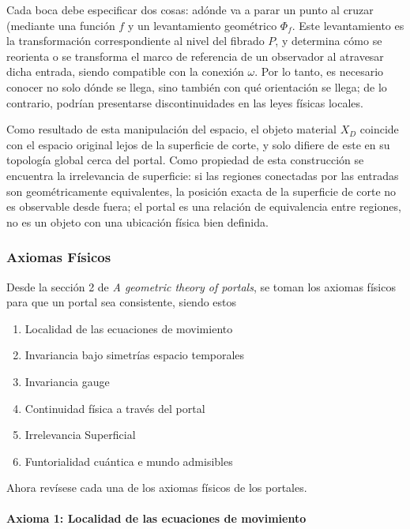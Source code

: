 \documentclass[12pt, twocolumn]{article}
\begin{document}
Cada boca debe especificar dos cosas: adónde va a parar un punto al cruzar (mediante una función $f$ y un levantamiento geométrico $\Phi_f$. Este levantamiento es la transformación correspondiente al nivel del fibrado $P$, y determina cómo se reorienta o se transforma el marco de referencia de un observador al atravesar dicha entrada, siendo compatible con la conexión $\omega$. Por lo tanto, es necesario conocer no solo dónde se llega, sino también con qué orientación se llega; de lo contrario, podrían presentarse discontinuidades en las leyes físicas locales.

Como resultado de esta manipulación del espacio, el objeto material $X_D$ coincide con el espacio original lejos de la superficie de corte, y solo difiere de este en su topología global cerca del portal. Como propiedad de esta construcción se encuentra la irrelevancia de superficie: si las regiones conectadas por las entradas son geométricamente equivalentes, la posición exacta de la superficie de corte no es observable desde fuera; el portal es una relación de equivalencia entre regiones, no es un objeto con una ubicación física bien definida.

\subsubsection{Axiomas Físicos}\label{sec:axiomas}

Desde la sección 2 de \textit{A geometric theory of portals}, se toman los axiomas físicos para que un portal sea consistente, siendo estos
 \begin{enumerate}
     \item Localidad de las ecuaciones de movimiento
     \item Invariancia bajo simetrías espacio temporales 
     \item Invariancia gauge
     \item Continuidad física a través del portal
     \item Irrelevancia Superficial 
     \item Funtorialidad cuántica e mundo admisibles
 \end{enumerate}

Ahora revísese cada una de los axiomas físicos de los portales.

\paragraph{Axioma 1: Localidad de las ecuaciones de movimiento}
\end{document}
